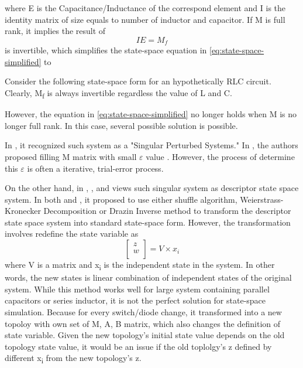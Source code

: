 \documentclass[conference]{IEEEtran}
\begin{document}
where E is the Capacitance/Inductance of the correspond element and I is the identity matrix of size equals to number of inductor and capacitor.
If M is full rank, it implies the result of \[ I E = M_{f}\] is invertible,
which simplifies the state-space equation in \eqref{eq:state-space-simplified} to 

Consider the following state-space form for an hypothetically RLC circuit. Clearly, M\textsubscript{f} is always invertible regardless the value of L and C.



However, the equation in \eqref{eq:state-space-simplified} no longer holds when M is no longer full rank.
In this case, several possible solution is possible.

In \cite{Verghese1102763}, it recognized such system as a "Singular Perturbed Systems." In \cite{Verghese1102763}, the authors proposed filling M matrix with small $\varepsilon$
value . However, the process of determine this $\varepsilon$ is often a iterative, trial-error process.

On the other hand, in \cite{Sajewski}, \cite{Galvao03102018}, and \cite{Li10363677} views such singular system as descriptor state space system. In both \cite{Sajewski} and \cite{Galvao03102018},
it proposed to use either shuffle algorithm, Weierstrass-Kronecker Decomposition or Drazin Inverse method to transform the descriptor state space system into standard state-space form.
However, the transformation involves redefine the state variable as \[ 
\begin{bmatrix}
  z \\
  w\\
\end{bmatrix} = V \times x_{i} \] 
where V is a matrix and x\textsubscript{i} is the independent state in the system. In other words,
the new states is linear combination of independent states of the original system. While this method works well for large system containing parallel capacitors or series inductor, it is not the 
perfect solution for state-space simulation. Because for every switch/diode change, it transformed into a new topoloy with own set of M, A, B matrix, which also changes the definition of state variable.
Given the new topology's initial state value depends on the old topology state value, it would be an issue if the old toplolgy's z defined by different x\textsubscript{i} from the new topology's z.
\end{document}
